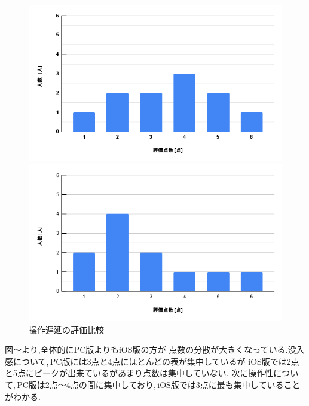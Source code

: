 \documentclass{ltjsreport}
\begin{document}
		\begin{figure}[H]
		\centering
		\begin{minipage}{0.45\columnwidth}
		\centering
		\includegraphics[width = \columnwidth]{../figs/PC-3.png}
		\end{minipage}
		\hspace{0.04\columnwidth}
		\begin{minipage}{0.45\columnwidth}
		\centering
		\includegraphics[width = \columnwidth]{../figs/iOS-3.png}
		\end{minipage}
		\caption{操作遅延の評価比較}
		\label{fig:tien}
		\end{figure}
		\vspace{-15pt}
		図～より,全体的にPC版よりもiOS版の方が
		点数の分散が大きくなっている.没入感について,\,PC版には3点と4点にほとんどの表が集中しているが
		iOS版では2点と5点にピークが出来ているがあまり点数は集中していない.
		次に操作性について,\,PC版は2点～4点の間に集中しており,\,iOS版では3点に最も集中していることがわかる.
\end{document}
